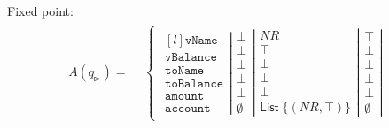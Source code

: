 Fixed point:
\begin{align}
    A(q_{\whitepointerright})=
    \begin{split}
        &\left\{\begin{matrix}
                   \left.\begin{matrix*}[l]
                             \texttt{vName}\\
                             \texttt{vBalance}\\
                             \texttt{toName}\\
                             \texttt{toBalance}\\
                             \texttt{amount}\\
                             \texttt{account}
                   \end{matrix*}\right|
                   \left.\begin{matrix}
                             \bot\\
                             \bot\\
                             \bot\\
                             \bot\\
                             \bot\\
                             \emptyset
                   \end{matrix}\right|
                   \left.\begin{matrix}
                             NR\\
                             \top\\
                             \bot\\
                             \bot\\
                             \bot\\
                             \mathsf{List} \; \{(NR,\top)\}
                   \end{matrix}\right|
                   \left.\begin{matrix}
                             \top\\
                             \bot\\
                             \bot\\
                             \bot\\
                             \bot\\
                             \emptyset
                   \end{matrix}\right|

\end{matrix}
\end{split}
\end{align}
